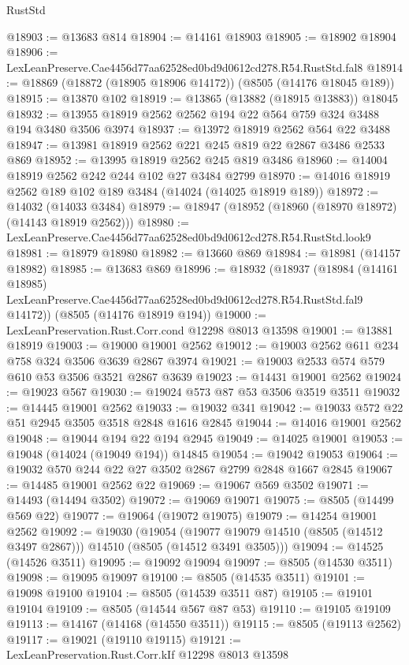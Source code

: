 \begin{lexlean}{RustStd}
\begin{coremodule}
@18903 := @13683 @814
@18904 := @14161 @18903
@18905 := @18902 @18904
@18906 := LexLeanPreserve.Cae4456d77aa62528ed0bd9d0612cd278.R54.RustStd.fal8
@18914 := @18869 (@18872 (@18905 @18906 @14172)) (@8505 (@14176 @18045 @189))
@18915 := @13870 @102
@18919 := @13865 (@13882 (@18915 @13883)) @18045
@18932 := @13955 @18919 @2562 @2562 @194 @22 @564 @759 @324 @3488 @194 @3480 @3506 @3974
@18937 := @13972 @18919 @2562 @564 @22 @3488
@18947 := @13981 @18919 @2562 @221 @245 @819 @22 @2867 @3486 @2533 @869
@18952 := @13995 @18919 @2562 @245 @819 @3486
@18960 := @14004 @18919 @2562 @242 @244 @102 @27 @3484 @2799
@18970 := @14016 @18919 @2562 @189 @102 @189 @3484 (@14024 (@14025 @18919 @189))
@18972 := @14032 (@14033 @3484)
@18979 := @18947 (@18952 (@18960 (@18970 @18972) (@14143 @18919 @2562)))
@18980 := LexLeanPreserve.Cae4456d77aa62528ed0bd9d0612cd278.R54.RustStd.look9
@18981 := @18979 @18980
@18982 := @13660 @869
@18984 := @18981 (@14157 @18982)
@18985 := @13683 @869
@18996 := @18932
    (@18937
      (@18984
        (@14161 @18985)
        LexLeanPreserve.Cae4456d77aa62528ed0bd9d0612cd278.R54.RustStd.fal9
        @14172))
    (@8505 (@14176 @18919 @194))
@19000 := LexLeanPreservation.Rust.Corr.cond @12298 @8013 @13598
@19001 := @13881 @18919
@19003 := @19000 @19001 @2562
@19012 := @19003 @2562 @611 @234 @758 @324 @3506 @3639 @2867 @3974
@19021 := @19003 @2533 @574 @579 @610 @53 @3506 @3521 @2867 @3639
@19023 := @14431 @19001 @2562
@19024 := @19023 @567
@19030 := @19024 @573 @87 @53 @3506 @3519 @3511
@19032 := @14445 @19001 @2562
@19033 := @19032 @341
@19042 := @19033 @572 @22 @51 @2945 @3505 @3518 @2848 @1616 @2845
@19044 := @14016 @19001 @2562
@19048 := @19044 @194 @22 @194 @2945
@19049 := @14025 @19001
@19053 := @19048 (@14024 (@19049 @194)) @14845
@19054 := @19042 @19053
@19064 := @19032 @570 @244 @22 @27 @3502 @2867 @2799 @2848 @1667 @2845
@19067 := @14485 @19001 @2562 @22
@19069 := @19067 @569 @3502
@19071 := @14493 (@14494 @3502)
@19072 := @19069 @19071
@19075 := @8505 (@14499 @569 @22)
@19077 := @19064 (@19072 @19075)
@19079 := @14254 @19001 @2562
@19092 := @19030
    (@19054 (@19077 @19079 @14510 (@8505 (@14512 @3497 @2867))) @14510 (@8505 (@14512 @3491 @3505)))
@19094 := @14525 (@14526 @3511)
@19095 := @19092 @19094
@19097 := @8505 (@14530 @3511)
@19098 := @19095 @19097
@19100 := @8505 (@14535 @3511)
@19101 := @19098 @19100
@19104 := @8505 (@14539 @3511 @87)
@19105 := @19101 @19104
@19109 := @8505 (@14544 @567 @87 @53)
@19110 := @19105 @19109
@19113 := @14167 (@14168 (@14550 @3511))
@19115 := @8505 (@19113 @2562)
@19117 := @19021 (@19110 @19115)
@19121 := LexLeanPreservation.Rust.Corr.kIf @12298 @8013 @13598

\end{coremodule}
\end{lexlean}
